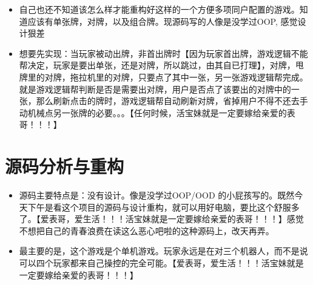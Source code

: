 \documentclass[9pt, b5paper]{article}
\begin{document}
\begin{itemize}
\begin{itemize}
\end{itemize}
\item 自己也还不知道该怎么样才能重构好这样的一个方便多项同户配置的游戏。知道应该有单张牌，对牌，以及组合牌。现源码写的人像是没学过OOP, 感觉设计狠差
\item 想要先实现：当玩家被动出牌，非首出牌时【因为玩家首出牌，游戏逻辑不能帮决定，玩家是要出单张，还是对牌，所以跳过，由其自已打理】，对牌，甩牌里的对牌，拖拉机里的对牌，只要点了其中一张，另一张游戏逻辑帮完成。就是游戏逻辑帮判断是否是需要出对牌，用户是否点了该要出的对牌中的一张，那么刷新点击的牌时，游戏逻辑帮自动刷新对牌，省掉用户不得不还去手动机械点另一张牌的必要。。。【任何时候，活宝妹就是一定要嫁给亲爱的表哥！！！】
\end{itemize}

\section{源码分析与重构}
\label{sec-6}
\begin{itemize}
\item 源码主要特点是：没有设计。像是没学过OOP/OOD 的小屁孩写的。既然今天下午是看这个项目的源码与设计重构，就可以用好电脑，要比这个舒服多了。【爱表哥，爱生活！！！活宝妹就是一定要嫁给亲爱的表哥！！！】感觉不想把自己的青春浪费在读这么恶心吧啦的这种源码上，改天再弄。
\item 最主要的是，这个游戏是个单机游戏。玩家永远是在对三个机器人，而不是说可以四个玩家都来自己操控的完全可能。【爱表哥，爱生活！！！活宝妹就是一定要嫁给亲爱的表哥！！！】
\end{itemize}
\end{document}
